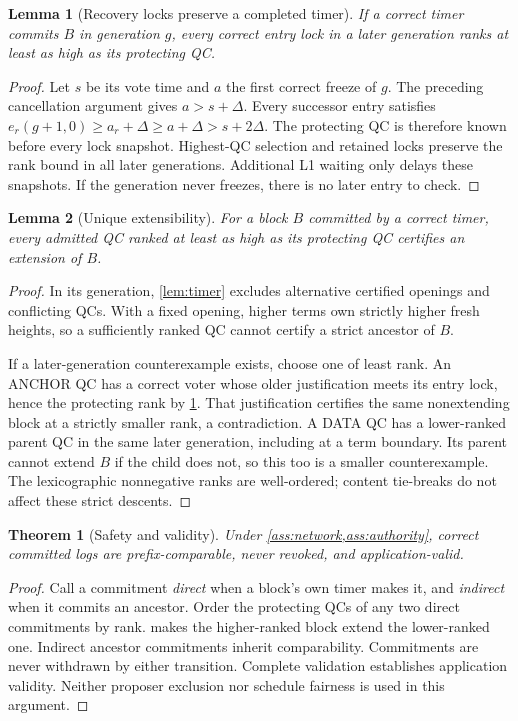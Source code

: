 \documentclass[11pt,a4paper]{article}
\newtheorem{lemma}[lemma]{Lemma}
\newtheorem{theorem}[theorem]{Theorem}
\begin{document}
\begin{lemma}[Recovery locks preserve a completed timer]
\label{lem:lock}
If a correct timer commits $B$ in generation $g$, every correct entry
lock in a later generation ranks at least as high as its protecting
QC.
\end{lemma}
\begin{proof}
Let $s$ be its vote time and $a$ the first correct freeze of $g$.
The preceding cancellation argument gives $a>s+\Delta$. Every successor
entry satisfies
$e_r(g+1,0)\ge a_r+\Delta\ge a+\Delta>s+2\Delta$.
The protecting QC is therefore known before every lock snapshot.
Highest-QC selection and retained locks preserve the rank bound in all
later generations. Additional L1 waiting only delays these snapshots.
If the generation never freezes, there is no later entry to check.
\end{proof}

\begin{lemma}[Unique extensibility]
\label{lem:extension}
For a block $B$ committed by a correct timer, every admitted QC ranked
at least as high as its protecting QC certifies an extension of $B$.
\end{lemma}
\begin{proof}
In its generation, \cref{lem:timer} excludes alternative certified
openings and conflicting QCs. With a fixed opening, higher terms own
strictly higher fresh heights, so a sufficiently ranked QC cannot certify
a strict ancestor of $B$.

If a later-generation counterexample exists, choose one of least rank.
An ANCHOR QC has a correct voter whose older justification meets its
entry lock, hence the protecting rank by \cref{lem:lock}. That justification
certifies the same nonextending block at a strictly smaller rank, a
contradiction. A DATA QC has a lower-ranked parent QC in the same later
generation, including at a term boundary. Its parent cannot extend $B$
if the child does not, so this too is a smaller counterexample. The
lexicographic nonnegative ranks are well-ordered; content tie-breaks do
not affect these strict descents.
\end{proof}

\begin{theorem}[Safety and validity]
\label{thm:safety}
Under \cref{ass:network,ass:authority}, correct committed logs are
prefix-comparable, never revoked, and application-valid.
\end{theorem}
\begin{proof}
Call a commitment \emph{direct} when a block's own timer makes it, and
\emph{indirect} when it commits an ancestor. Order the protecting QCs of
any two direct  commitments by rank.
 makes the higher-ranked block extend the lower-ranked
one. Indirect ancestor commitments inherit comparability. Commitments
are never withdrawn by either transition. Complete validation establishes
application validity. Neither proposer exclusion nor schedule fairness
is used in this argument.
\end{proof}
\end{document}
